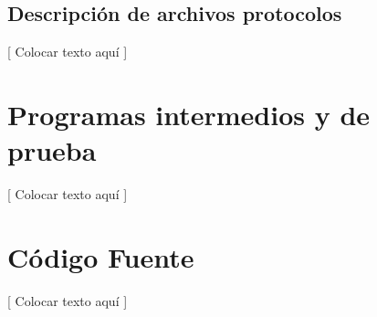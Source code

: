 \documentclass{article}
\begin{document}
\subsection{Descripción de archivos  protocolos}

	[ Colocar texto aquí ]
\bigskip










\section{Programas intermedios y de prueba}

	[ Colocar texto aquí ]
\bigskip




\section{Código Fuente}

	[ Colocar texto aquí ]
\bigskip
\end{document}
